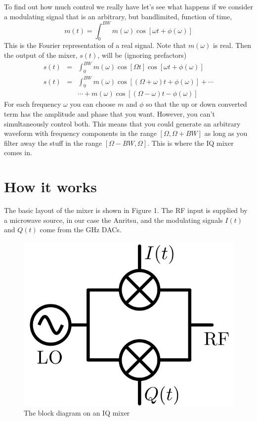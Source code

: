 \documentclass{article}
\begin{document}
To find out how much control we really have let's see what happens
if we consider a modulating signal that is an arbitrary, but bandlimited,
function of time,\[
m(t)=\int_{0}^{BW}m(\omega)\cos\left[\omega t+\phi(\omega)\right]\]
 This is the Fourier representation of a real signal. Note that $m(\omega)$
is real. Then the output of the mixer, $s(t)$, will be (ignoring
prefactors)\begin{eqnarray*}
s(t) & = & \int_{0}^{BW}m(\omega)\cos\left[\Omega t\right]\cos\left[\omega t+\phi(\omega)\right]\\
s(t) & = & \int_{0}^{BW}m(\omega)\cos\left[\left(\Omega+\omega\right)t+\phi(\omega)\right]+\cdots\\
 &  & \cdots+m(\omega)\cos\left[\left(\Omega-\omega\right)t-\phi(\omega)\right]\end{eqnarray*}
 For each frequency $\omega$ you can choose $m$ and $\phi$ so that
the up or down converted term has the amplitude and phase that you
want. However, you can't simultaneously control both. This means that
you could generate an arbitrary waveform with frequency components
in the range $\left[\Omega,\Omega+BW\right]$ as long as you filter
away the stuff in the range $\left[\Omega-BW,\Omega\right]$. This
is where the IQ mixer comes in.


\section{How it works}

The basic layout of the mixer is shown in Figure 1. The RF input is
supplied by a microwave source, in our case the Anritsu, and the modulating
signals $I(t)$ and $Q(t)$ come from the GHz DACs. %
\begin{figure}
\includegraphics[scale=0.5]{diagram}
\caption{The block diagram on an IQ mixer}
\end{figure}
\end{document}
